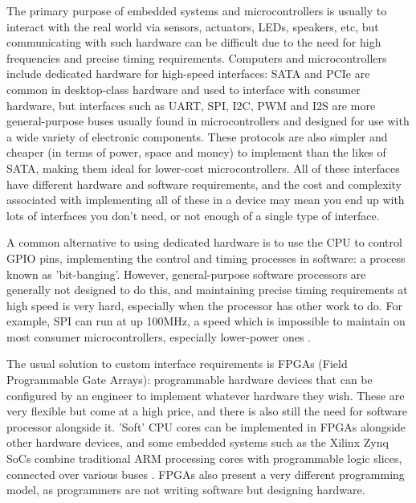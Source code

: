 \documentclass[a4paper,fleqn,12pt]{article}
\begin{document}
The primary purpose of embedded systems and microcontrollers is usually to interact with the real world via sensors, actuators, LEDs, speakers, etc, but communicating with such hardware can be difficult due to the need for high frequencies and precise timing requirements. Computers and microcontrollers include dedicated hardware for high-speed interfaces: SATA and PCIe are common in desktop-class hardware and used to interface with consumer hardware, but interfaces such as UART, SPI, I2C, PWM and I2S are more general-purpose buses usually found in microcontrollers and designed for use with a wide variety of electronic components. These protocols are also simpler and cheaper (in terms of power, space and money) to implement than the likes of SATA, making them ideal for lower-cost microcontrollers. All of these interfaces have different hardware and software requirements, and the cost and complexity associated with implementing all of these in a device may mean you end up with lots of interfaces you don't need, or not enough of a single type of interface.

A common alternative to using dedicated hardware is to use the CPU to control GPIO pins, implementing the control and timing processes in software: a process known as 'bit-banging'. However, general-purpose software processors are generally not designed to do this, and maintaining precise timing requirements at high speed is very hard, especially when the processor has other work to do. For example, SPI can run at up 100MHz, a speed which is impossible to maintain on most consumer microcontrollers, especially lower-power ones \citep{picosdk}.

The usual solution to custom interface requirements is FPGAs (Field Programmable Gate Arrays): programmable hardware devices that can be configured by an engineer to implement whatever hardware they wish. These are very flexible but come at a high price, and there is also still the need for software processor alongside it. 'Soft' CPU cores can be implemented in FPGAs alongside other hardware devices, and some embedded systems such as the Xilinx Zynq SoCs combine traditional ARM processing cores with programmable logic slices, connected over various buses \citep{zynq}. FPGAs also present a very different programming model, as programmers are not writing software but designing hardware.
\end{document}
